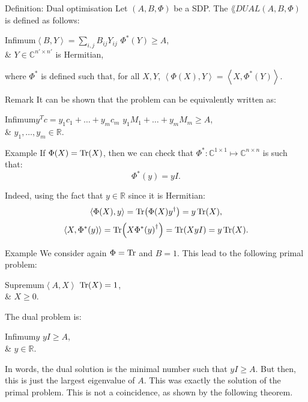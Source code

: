\documentclass[a4paper]{article}
\begin{document}
\begin{parag}{Definition: Dual optimisation}
    Let $\left(A, B, \Phi\right)$ be a SDP. The  $\lang{DUAL}\left(A, B, \Phi\right)$ is defined as follows: 
    \begin{semidefiniteprogram}{Infimum}{$\left\langle B, Y \right\rangle = \sum_{i, j} B_{ij} Y_{i j}$}
        $\Phi^*\left(Y\right) \geq A$,\\
        & $Y \in \mathbb{C}^{n' \times n'}$ is Hermitian,
    \end{semidefiniteprogram}
    where $\Phi^*$ is defined such that, for all $X, Y$, $\left\langle \Phi\left(X\right), Y \right\rangle = \left\langle X, \Phi^*\left(Y\right) \right\rangle$.

    \begin{subparag}{Remark}
        It can be shown that the  problem can be equivalently written as:
        \begin{semidefiniteprogram}{Infimum}{$y^T c = y_1 c_1 + \ldots + y_m c_m$}
            $y_1 M_1 + \ldots + y_m M_m \geq A$, \\
            & $y_1, \ldots, y_m \in \mathbb{R}$.
        \end{semidefiniteprogram}
    \end{subparag}

    \begin{subparag}{Example}
        If $\Phi\left(X\right) = \Tr\left(X\right)$, then we can check that $\Phi^*: \mathbb{C}^{1 \times 1} \mapsto \mathbb{C}^{n \times n}$ is such that: 
        \[\Phi^*\left(y\right) = y I.\]

        Indeed, using the fact that $y \in \mathbb{R}$ since it is Hermitian: 
        \[\left\langle \Phi\left(X\right), y \right\rangle = \Tr\left(\Phi\left(X\right) y^{\dagger}\right) = y\Tr\left(X\right),\]
        \[\left\langle X, \Phi^*\left(y\right) \right\rangle = \Tr\left(X \Phi^*\left(y\right)^{\dagger}\right) = \Tr\left(X y I\right) = y \Tr\left(X\right).\]
    \end{subparag}
\end{parag}

\begin{parag}{Example}
    We consider again $\Phi = \operatorname{Tr}$ and $B = 1$. This lead to the following primal problem:
    \begin{semidefiniteprogram}{Supremum}{$\left\langle A, X \right\rangle$}
        $\Tr\left(X\right) = 1$,\\
        & $X \geq 0$.
    \end{semidefiniteprogram}

    The dual problem is:
    \begin{semidefiniteprogram}{Infimum}{$y$}
        $y I \geq A$,\\
        & $y \in \mathbb{R}$.
    \end{semidefiniteprogram}

    In words, the dual solution is the minimal number such that $yI \geq A$. But then, this is just the largest eigenvalue of $A$. This was exactly the solution of the primal problem. This is not a coincidence, as shown by the following theorem.
\end{parag}
\end{document}

